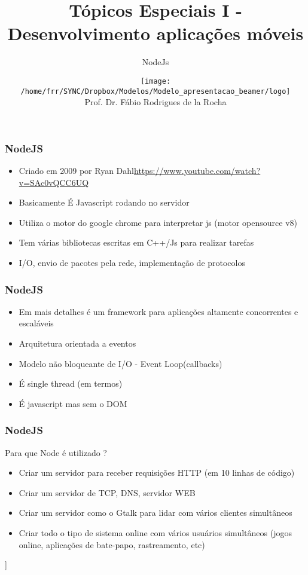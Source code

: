 \documentclass[14pt]{beamer}
\title[]{\huge Tópicos Especiais I - Desenvolvimento aplicações móveis}
\subtitle{NodeJs}
\institute[Apresentação]{}
\author[]{\texttt{[image: /home/frr/SYNC/Dropbox/Modelos/Modelo\_apresentacao\_beamer/logo]}\\Prof. Dr. Fábio Rodrigues de la Rocha}
\date[]{}
\begin{document}
\frame{\titlepage}



\begin{frame}\frametitle{NodeJS}
\begin{itemize}
\item Criado em 2009 por Ryan Dahl{\tiny{\url{https://www.youtube.com/watch?v=SAc0vQCC6UQ}}}
\pause
\item Basicamente É Javascript rodando no servidor
\pause
\item Utiliza o motor do google chrome para interpretar js (motor opensource v8)
\pause
\item Tem várias bibliotecas escritas em C++/Js para realizar tarefas
\pause 
\item I/O, envio de pacotes pela rede, implementação de protocolos


\end{itemize}
\end{frame}


\begin{frame}\frametitle{NodeJS}
\begin{itemize}
\item Em mais detalhes é um framework para aplicações altamente concorrentes e escaláveis
\pause
\item Arquitetura orientada a eventos
\pause
\item Modelo não bloqueante de I/O - Event Loop(callbacks)
\pause
\item É single thread (em termos)

\pause
\item É javascript mas sem o DOM

\end{itemize}
\end{frame}



\begin{frame}\frametitle{NodeJS}
\begin{block}{Para que Node é utilizado ?}
\begin{itemize}
 \item Criar um servidor para receber requisições HTTP (em 10 linhas de código)
 \item Criar um servidor de TCP, DNS, servidor WEB
 \item Criar um servidor como o Gtalk para lidar com vários clientes simultâneos
 \item Criar todo o tipo de sistema online com vários usuários simultâneos (jogos online, aplicações de bate-papo, rastreamento, etc)
\end{itemize}




\end{block}]
\end{frame}
\end{document}
